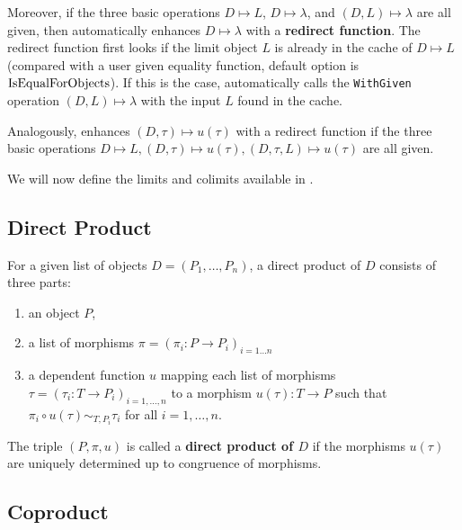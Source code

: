 Moreover, if the three basic operations $D \mapsto L$, $D \mapsto \lambda$, and $( D, L ) \mapsto \lambda$
are all given, then \CapPkg automatically enhances $D \mapsto \lambda$ with a \textbf{redirect function}\label{in_text:redirect}.
The redirect function first looks if the limit object $L$ is already in the cache of $D \mapsto L$
(compared with a user given equality function, default option is $\mathrm{IsEqualForObjects}$).
If this is the case, \CapPkg automatically calls the \texttt{WithGiven} operation $( D, L ) \mapsto \lambda$
with the input $L$ found in the cache.

Analogously, \CapPkg enhances $( D, \tau ) \mapsto u(\tau)$ with a redirect function if
the three basic operations $D \mapsto L, ( D, \tau ) \mapsto u(\tau), ( D, \tau, L ) \mapsto u( \tau )$ are all given.

We will now define the limits and colimits available in \CapPkg.

\subsection{Direct Product}

\begin{definition}
 For a given list of objects $D = ( P_1, \dots, P_n )$, a direct product of $D$ consists of three parts:
 \begin{enumerate}
  \item an object $P$,
  \item a list of morphisms $\pi = ( \pi_i: P \rightarrow P_i )_{i = 1 \dots n}$ 
  \item a dependent function $u$ mapping each list of morphisms $\tau = ( \tau_i: T \rightarrow P_i )_{i = 1, \dots, n}$ 
  to a morphism $u(\tau): T \rightarrow P$ such that $\pi_i \circ u( \tau ) \sim_{T,P_i} \tau_i$ for all $i = 1, \dots, n$.
 \end{enumerate}
 The triple $( P, \pi, u )$ is called a \textbf{direct product of $D$} if the morphisms $u( \tau )$ are uniquely determined up to
 congruence of morphisms.
\end{definition}

\subsection{Coproduct}


